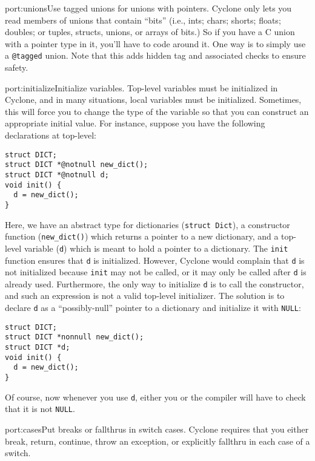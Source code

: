 \begin{porta}{port:unions}{Use tagged unions for unions with pointers.}
Cyclone only lets you read members of unions that 
contain ``bits'' (i.e., ints; chars;
shorts; floats; doubles; or tuples, structs, unions, or arrays of bits.)
So if you have a C union with a pointer type in it, you'll have to
code around it.  One way is to simply use a \texttt{@tagged} union.
Note that this adds hidden tag and associated checks to ensure safety.
\end{porta}

\begin{porta}{port:initialize}{Initialize variables.}  
Top-level variables must be initialized
in Cyclone, and in many situations, local variables must be initialized.
Sometimes, this will force you to change the type of the variable
so that you can construct an appropriate initial value.  For instance,
suppose you have the following declarations at top-level:
\begin{verbatim}
struct DICT; 
struct DICT *@notnull new_dict();
struct DICT *@notnull d;
void init() {
  d = new_dict();
}
\end{verbatim}

Here, we have an abstract type for dictionaries 
(\texttt{struct Dict}), a constructor
function (\texttt{new\_dict()}) which returns a pointer to a new
dictionary, and a top-level variable (\texttt{d}) which is meant
to hold a pointer to a dictionary.  The \texttt{init} function
ensures that \texttt{d} is initialized.  However, 
Cyclone would complain that 
\texttt{d} is not initialized because \texttt{init} may not be
called, or it may only be called after \texttt{d} is already used.  
Furthermore, the only way to initialize \texttt{d}
is to call the constructor, and such an expression is not a 
valid top-level initializer.  The solution is to declare \texttt{d} as
a ``possibly-null'' pointer to a dictionary and initialize it
with \texttt{NULL}:
\begin{verbatim}
struct DICT; 
struct DICT *nonnull new_dict();
struct DICT *d;
void init() {
  d = new_dict();
}
\end{verbatim}

Of course, now whenever you use \texttt{d}, either you or the compiler
will have to check that it is not \texttt{NULL}.
\end{porta}

\begin{porta}{port:cases}{Put breaks or fallthrus in switch cases.}  
Cyclone requires
that you either break, return, continue, throw an exception, or explicitly
fallthru in each case of a switch.  
\end{porta}

